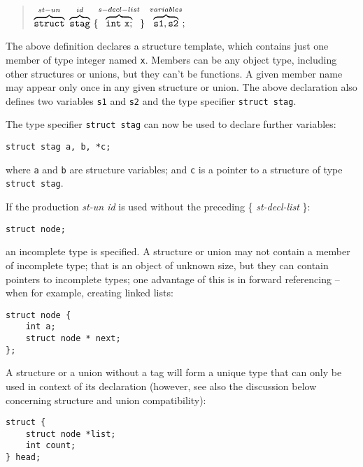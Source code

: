 \begin{quote}
        $\overbrace{\tt struct}^{st-un}\ \overbrace{\tt stag}^{id}\
\{\overbrace{\T{int\ x;}}^{s-decl-list}\}\
\overbrace{\T{s1,s2}}^{variables}; $
\end{quote}

The above definition declares a structure template, which contains
just one member of type integer named {\tt x}. Members can be any
object type, including other structures or unions, but they can't be
functions.  A given member name may appear only once in any given
structure or union. The above declaration also defines two variables
{\tt s1} and {\tt s2} and the type specifier {\tt struct stag}.

The type specifier {\tt struct stag} can now be used to declare
further variables:
\begin{production}
\begin{verbatim}
struct stag a, b, *c;
\end{verbatim}
\end{production}
 where {\tt a} and {\tt b} are structure variables; and {\tt c} is a
pointer to a structure of type {\tt struct stag}.

If the production {\it st-un id} is used without the preceding
\{ {\it st-decl-list} \}:
\begin{production}
\begin{verbatim}
struct node;
\end{verbatim}
\end{production}
 an incomplete type is specified. A structure or union may not contain
a member of incomplete type; that is an object of unknown size, but
they can contain pointers to incomplete types; one advantage of this
is in forward referencing -- when for example, creating linked lists:

\begin{production}
\begin{verbatim}
struct node {
    int a;
    struct node * next;
};
\end{verbatim}
\end{production}

A structure or a union without a tag will form a unique type that
can only be used in context of its declaration (however, see also the
discussion below concerning structure and union compatibility):

\begin{production}
\begin{verbatim}
struct {
    struct node *list;
    int count;
} head;
\end{verbatim}
\end{production}

